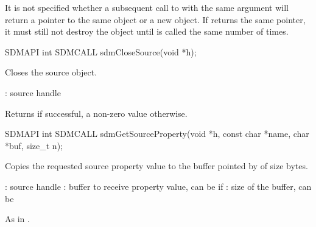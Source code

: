 \documentclass[a4paper,12pt,twoside,extrafontsizes]{memoir}
\begin{document}
\begin{funcremarks}
	It is not specified whether a subsequent call to  with the same  argument will return a pointer to the same object or a new object. If  returns the same pointer, it must still not destroy the object until  is called the same number of times.
\end{funcremarks}



\begin{cfuncprototype}
SDMAPI int SDMCALL sdmCloseSource(void *h);
\end{cfuncprototype}

\begin{funcdescr}
	Closes the source object.
\end{funcdescr}

\begin{funcparams}
	: source handle
\end{funcparams}

\begin{funcret}
	Returns  if successful, a non-zero value otherwise.
\end{funcret}



\begin{cfuncprototype}
SDMAPI int SDMCALL sdmGetSourceProperty(void *h, const char *name, char *buf, size_t n);
\end{cfuncprototype}

\begin{funcdescr}
	Copies the requested source property value to the buffer pointed by  of size  bytes.
\end{funcdescr}

\begin{funcparams}
	: source handle
	: buffer to receive property value, can be  if 
	: size of the buffer, can be 
\end{funcparams}

\begin{funcret}
	As in .
\end{funcret}
\end{document}
